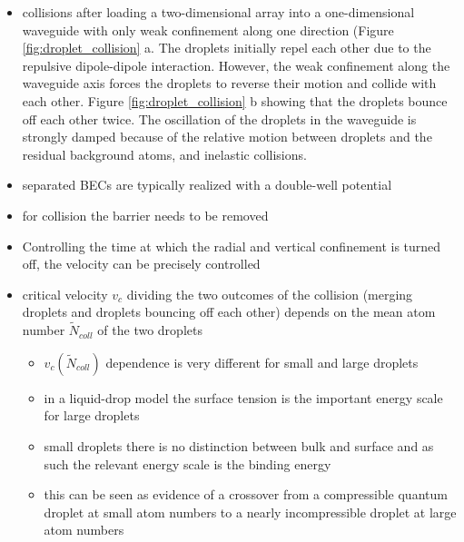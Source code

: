 \begin{itemize}
    \item collisions after loading a two-dimensional array into a one-dimensional waveguide with only weak confinement along one direction (Figure \ref{fig:droplet_collision} a. The droplets initially repel
each other due to the repulsive dipole-dipole interaction. However, the weak confinement
along the waveguide axis forces the droplets to reverse their motion and collide with each
other. Figure \ref{fig:droplet_collision} b showing that the droplets bounce off each other twice. The oscillation of the droplets in the waveguide is strongly damped because of the relative motion between
droplets and the residual background atoms, and inelastic collisions.

    \item separated BECs are typically realized with a double-well potential
    \item for collision the barrier needs to be removed
    \item Controlling the time at which the radial and vertical confinement is turned off, the velocity can be precisely controlled
    \item critical velocity $v_{c}$ dividing the two outcomes of the collision (merging droplets and droplets bouncing off each other) depends on the mean atom number $\tilde{N}_{coll}$ of the two droplets
    \begin{itemize}
        \item $v_{c}\left(\tilde{N}_{coll}\right)$ dependence is very different for small and large droplets
        \item in a liquid-drop model the surface tension is the important energy scale for large droplets
        \item small droplets there is no distinction between bulk and surface and as such the relevant energy scale is the binding energy
        \item this can be seen as evidence of a crossover from a compressible quantum droplet at small atom numbers to a nearly incompressible droplet at large atom numbers
    \end{itemize}
\end{itemize}

